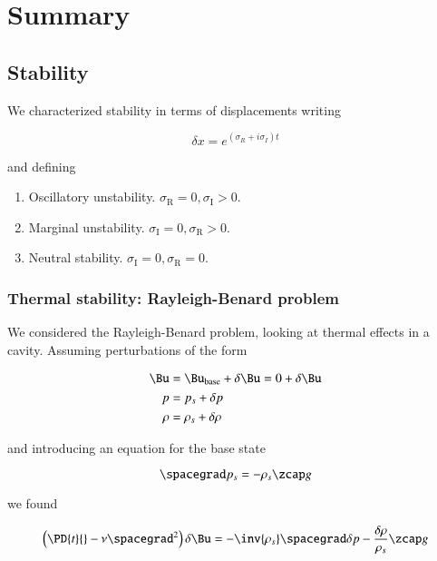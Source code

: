 \section{Summary}
\subsection{Stability}

We characterized stability in terms of displacements writing

\begin{equation}\label{eqn:continuumFluidsReview:2770}
\delta x = e^{(\sigma_R + i \sigma_I) t}
\end{equation}

and defining
\begin{enumerate}
\item Oscillatory unstability.  $\sigma_{\text{R}} = 0, \sigma_{\text{I}} > 0$.
\item Marginal unstability.  $\sigma_{\text{I}} = 0, \sigma_{\text{R}} > 0$.
\item Neutral stability.  $\sigma_{\text{I}} = 0, \sigma_{\text{R}} = 0$.
\end{enumerate}

\subsubsection{Thermal stability: Rayleigh-Benard problem}

We considered the Rayleigh-Benard problem, looking at thermal effects in a cavity.  Assuming perturbations of the form

\begin{align*}
\Bu &= \Bu_{\text{base}} + \delta \Bu = 0 + \delta \Bu \\
p &= p_s + \delta p \\
\rho &= \rho_s + \delta \rho
\end{align*}

and introducing an equation for the base state

\begin{equation}\label{eqn:continuumFluidsReview:2790}
\spacegrad p_s = -\rho_s \zcap g
\end{equation}

we found

\begin{equation}\label{eqn:continuumFluidsReview:2810}
\left( \PD{t}{} - \nu \spacegrad^2 \right) \delta \Bu = -\inv{\rho_s} \spacegrad \delta p - \frac{\delta \rho}{\rho_s} \zcap g
\end{equation}

